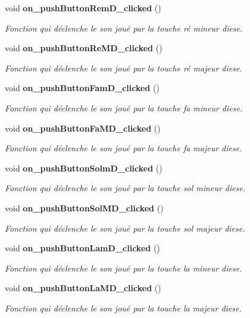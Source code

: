 \begin{DoxyCompactItemize}
void {\bf on\-\_\-push\-Button\-Rem\-D\-\_\-clicked} ()
\begin{DoxyCompactList}\small\item\em Fonction qui déclenche le son joué par la touche ré mineur diese. \end{DoxyCompactList}\item 
void {\bf on\-\_\-push\-Button\-Re\-M\-D\-\_\-clicked} ()
\begin{DoxyCompactList}\small\item\em Fonction qui déclenche le son joué par la touche ré majeur diese. \end{DoxyCompactList}\item 
void {\bf on\-\_\-push\-Button\-Fam\-D\-\_\-clicked} ()
\begin{DoxyCompactList}\small\item\em Fonction qui déclenche le son joué par la touche fa mineur diese. \end{DoxyCompactList}\item 
void {\bf on\-\_\-push\-Button\-Fa\-M\-D\-\_\-clicked} ()
\begin{DoxyCompactList}\small\item\em Fonction qui déclenche le son joué par la touche fa majeur diese. \end{DoxyCompactList}\item 
void {\bf on\-\_\-push\-Button\-Solm\-D\-\_\-clicked} ()
\begin{DoxyCompactList}\small\item\em Fonction qui déclenche le son joué par la touche sol mineur diese. \end{DoxyCompactList}\item 
void {\bf on\-\_\-push\-Button\-Sol\-M\-D\-\_\-clicked} ()
\begin{DoxyCompactList}\small\item\em Fonction qui déclenche le son joué par la touche sol majeur diese. \end{DoxyCompactList}\item 
void {\bf on\-\_\-push\-Button\-Lam\-D\-\_\-clicked} ()
\begin{DoxyCompactList}\small\item\em Fonction qui déclenche le son joué par la touche la mineur diese. \end{DoxyCompactList}\item 
void {\bf on\-\_\-push\-Button\-La\-M\-D\-\_\-clicked} ()
\begin{DoxyCompactList}\small\item\em Fonction qui déclenche le son joué par la touche la majeur diese. \end{DoxyCompactList}\end{DoxyCompactItemize}

